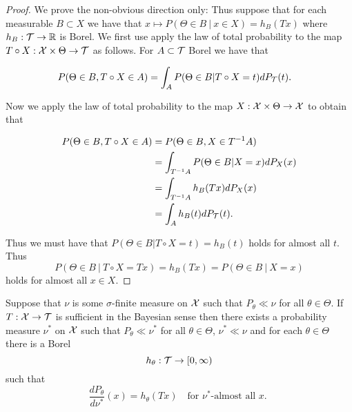\documentclass[twoside, a4paper, 10pt]{amsart}
\begin{document}
\begin{proof} We prove the non-obvious direction only: Thus suppose that for each measurable $B \subset X$ we have that $x\mapsto P(\Theta \in B ~|~ x \in X) = h_B(Tx)$ where $h_B: \mathcal{T} \to \mathbb{R}$ is Borel. We first use apply the law of total probability to the map $T\circ X:\mathcal{X} \times \Theta \to \mathcal{T}$ as follows. For $A \subset \mathcal{T}$ Borel we have that

\begin{align*} P(\Theta \in B, T\circ X \in A) &= \int_{A} P(\Theta \in B| T\circ X = t) dP_{\mathcal{T}}(t).\end{align*} 

Now we apply the law of total probability to the map $X:\mathcal{X} \times \Theta \to \mathcal{X}$ to obtain that 

\begin{align*} P(\Theta \in B, T\circ X \in A) &= P(\Theta \in B , X \in T^{-1}A) \\
&= \int_{T^{-1}A} P(\Theta \in B | X = x)dP_X(x) \\ 
&= \int_{T^{-1}A} h_B(Tx) dP_X(x) \\
&= \int_A h_B(t) dP_{\mathcal{T}}(t).\end{align*} 

Thus we must have that $P(\Theta \in B | T \circ X = t) = h_B(t)$ holds for almost all $t$. Thus $$P(\Theta \in B ~|~ T \circ X = Tx) = h_B(Tx) = P(\Theta \in B ~|~ X = x)$$ holds for almost all $x \in X$. \end{proof}

\begin{lemma} \label{lemma: construction nu*} Suppose that $\nu$ is some $\sigma$-finite measure on $\mathcal{X}$ such that $P_{\theta} \ll \nu$ for all $\theta \in \Theta$. If $T:\mathcal{X} \to \mathcal{T}$ is sufficient in the Bayesian sense then there exists a probability measure $\nu^*$ on $\mathcal{X}$ such that $P_{\theta} \ll \nu^*$ for all $\theta \in \Theta$, $\nu^* \ll \nu$ and for each $\theta \in \Theta$ there is a Borel $$h_{\theta}:\mathcal{T} \to [0,\infty)$$ such that $$\frac{dP_{\theta}}{d\nu^*}(x) = h_{\theta}(Tx) \quad\text{for $\nu^*$-almost all $x$. }$$

\end{lemma}
\end{document}

